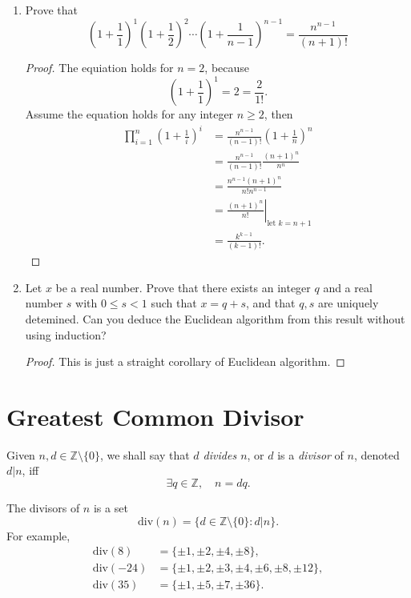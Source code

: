 \begin{enumerate}[1.]
	\item Prove that
	$$
	\left( 1 + \frac{1}{1} \right)^1 \left( 1 + \frac{1}{2} \right)^2 \cdots \left( 1 + \frac{1}{n - 1} \right)^{n-1} = \frac{n^{n-1}}{(n + 1)!}
	$$
	\begin{proof}
		The equiation holds for $n = 2$, because
		$$
		\left( 1 + \frac{1}{1} \right)^1 = 2 = \frac{2}{1!}.
		$$
		Assume the equation holds for any integer $n \ge 2$, then
		$$
		\begin{aligned}
			\prod_{i=1}^{n}\left( 1 + \frac{1}{i} \right)^{i} &= \frac{n^{n-1}}{(n-1)!}\left( 1 + \frac{1}{n} \right)^n \\
			&= \frac{n^{n-1}}{(n-1)!}\frac{(n + 1)^n}{n^n} \\
			&= \frac{n^{n-1}(n+ 1)^n}{n! n^{n-1}} \\
			&= \left. \frac{(n + 1)^n}{n!} \right|_{\text{let $k = n + 1$}} \\
			&= \frac{k^{k - 1}}{(k -1)!}.
		\end{aligned}
		$$
	\end{proof}
	
	\item Let $x$ be a real number. Prove that there exists an integer $q$ and a real number $s$ with $0 \le s < 1$ such that $x = q + s$, and that $q, s$ are uniquely detemined. Can you deduce the Euclidean algorithm from this result without using induction?
	\begin{proof}
		This is just a straight corollary of Euclidean algorithm.
	\end{proof}
\end{enumerate}


\section{Greatest Common Divisor}

\begin{definition}
	Given $n,d \in \mathbb Z \setminus \{ 0 \}$, we shall say that \textit{$d$ divides $n$}, or $d$ is a \textit{divisor} of $n$, denoted $d|n$, iff
	$$
	\exists q \in \mathbb Z, \quad n = dq.
	$$
\end{definition}

The divisors of $n$ is a set
$$
\mathrm{div}(n) = \{ d \in \mathbb Z \setminus \{0\} : d|n \}.
$$
For example,
$$
\begin{aligned}
	\mathrm{div}(8) &= \{ \pm 1, \pm 2, \pm 4, \pm 8 \}, \\
	\mathrm{div}(-24) &= \{ \pm 1, \pm 2, \pm 3, \pm 4, \pm 6, \pm 8,  \pm 12 \}, \\
	\mathrm{div}(35) &= \{ \pm 1, \pm 5, \pm 7, \pm 36 \} .
\end{aligned}
$$

